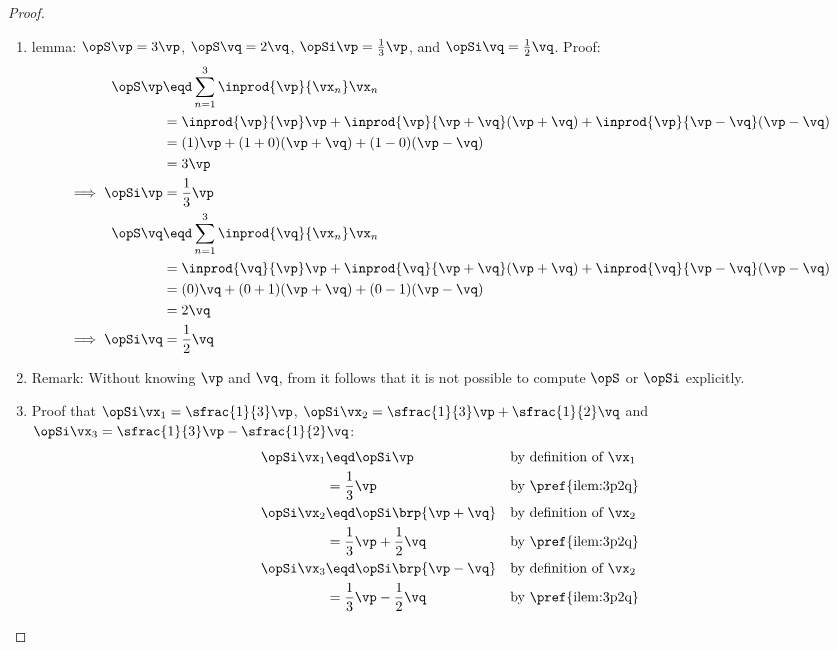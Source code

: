 \begin{proof}
\begin{enumerate}
  \item lemma: $\opS\vp=3\vp$, $\opS\vq=2\vq$, $\opSi\vp=\frac{1}{3}\vp$, and $\opSi\vq=\frac{1}{2}\vq$. Proof: \label{ilem:3p2q}
    \begin{align*}
      \opS\vp
        &\eqd \sum_{n=1}^3 \inprod{\vp}{\vx_n}\vx_n
      \\&=    \inprod{\vp}{\vp}\vp + \inprod{\vp}{\vp+\vq}(\vp+\vq) + \inprod{\vp}{\vp-\vq}(\vp-\vq)
      \\&=    (1)\vp + (1+0)(\vp+\vq) + (1-0)(\vp-\vq)
      \\&=    3\vp
      \\\implies \opSi\vp
        &=\frac{1}{3}\vp
      \\
      \opS\vq
        &\eqd \sum_{n=1}^3 \inprod{\vq}{\vx_n}\vx_n
      \\&=    \inprod{\vq}{\vp}\vp + \inprod{\vq}{\vp+\vq}(\vp+\vq) + \inprod{\vq}{\vp-\vq}(\vp-\vq)
      \\&=    (0)\vq + (0+1)(\vp+\vq) + (0-1)(\vp-\vq)
      \\&=    2\vq
      \\\implies \opSi\vq
        &=    \frac{1}{2}\vq
    \end{align*}

   \item Remark: Without knowing $\vp$ and $\vq$, from  it follows that 
                 it is not possible to compute $\opS$ or $\opSi$ explicitly.

   \item Proof that $\opSi\vx_1=\sfrac{1}{3}\vp$, $\opSi\vx_2=\sfrac{1}{3}\vp+\sfrac{1}{2}\vq$ 
         and $\opSi\vx_3=\sfrac{1}{3}\vp-\sfrac{1}{2}\vq$:
     \begin{align*}
       \opSi\vx_1 
         &\eqd \opSi\vp
         && \text{by definition of $\vx_1$}
       \\&= \frac{1}{3}\vp
         && \text{by \pref{ilem:3p2q}}
         \\
       \opSi\vx_2
         &\eqd \opSi\brp{\vp+\vq}
         && \text{by definition of $\vx_2$}
       \\&= \frac{1}{3}\vp + \frac{1}{2}\vq
         && \text{by \pref{ilem:3p2q}}
         \\
       \opSi\vx_3
         &\eqd \opSi\brp{\vp-\vq}
         && \text{by definition of $\vx_2$}
       \\&= \frac{1}{3}\vp - \frac{1}{2}\vq
         && \text{by \pref{ilem:3p2q}}
     \end{align*}



\end{enumerate}
\end{proof}
